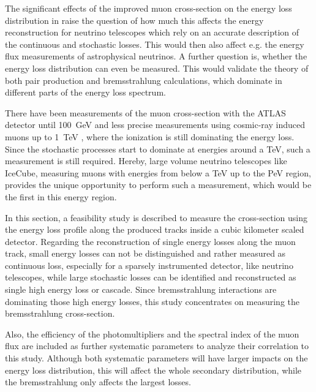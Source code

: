 The significant effects of the improved muon cross-section on the energy loss distribution in  raise the question of how much this affects the energy reconstruction for neutrino telescopes which rely on an accurate description of the continuous and stochastic losses.
This would then also affect e.g. the energy flux measurements of astrophysical neutrinos.
A further question is, whether the energy loss distribution can even be measured.
This would validate the theory of both pair production and bremsstrahlung calculations, which dominate in different parts of the energy loss spectrum.

There have been measurements of the muon cross-section with the ATLAS detector until \SI{100}{GeV} \cite{Amaral01MuonMeasure} and less precise measurements using cosmic-ray induced muons up to \SI{1}{TeV} \cite{Sakumoto92TeVMuonMeasure}, where the ionization is still dominating the energy loss.
Since the stochastic processes start to dominate at energies around a TeV, such a measurement is still required.
Hereby, large volume neutrino telescopes like IceCube, measuring muons with energies from below a TeV up to the PeV region, provides the unique opportunity to perform such a measurement, which would be the first in this energy region.

In this section, a feasibility study is described to measure the cross-section using the energy loss profile along the produced tracks inside a cubic kilometer scaled detector.
Regarding the reconstruction of single energy losses along the muon track, small energy losses can not be distinguished and rather measured as continuous loss, especially for a sparsely instrumented detector, like neutrino telescopes, while large stochastic losses can be identified and reconstructed as single high energy loss or cascade.
Since bremsstrahlung interactions are dominating those high energy losses, this study concentrates on measuring the bremsstrahlung cross-section.

Also, the efficiency of the photomultipliers and the spectral index of the muon flux are included as further systematic parameters to analyze their correlation to this study.
Although both systematic parameters will have larger impacts on the energy loss distribution, this will affect the whole secondary distribution, while the bremsstrahlung only affects the largest losses.

